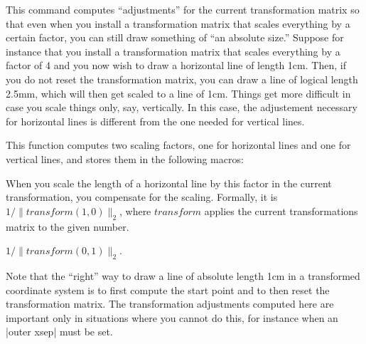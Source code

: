 \begin{command}{\pgftransformationadjustments}
  This command computes ``adjustments'' for the current transformation
  matrix so that even when you install a transformation matrix that
  scales everything by a certain factor, you can still draw
  something of ``an absolute size.'' Suppose for instance that you
  install a transformation matrix that scales everything by a factor
  of 4 and you now wish to draw a horizontal line of length 1cm. Then,
  if you do not reset the transformation matrix, you can draw a line
  of logical length 2.5mm, which will then get scaled to a line of
  1cm. Things get more difficult in case you scale things only, say,
  vertically. In this case, the adjustement necessary for horizontal
  lines is different from the one needed for vertical lines.

  This function computes two scaling factors, one for horizontal lines
  and one for vertical lines, and stores them in the following macros:
  \begin{command}{\pgfhorizontaltransformationadjustment}
    When you scale the length of a horizontal line by this factor in
    the current transformation, you compensate for the
    scaling. Formally, it is $1/\|\mathit{transform}(1,0)\|_2$, where
    $\mathit{transform}$ applies the current transformations matrix to
    the given number.
\begin{codeexample}[]
\end{codeexample}
\begin{codeexample}[]
\end{codeexample}
  \end{command}
  \begin{command}{\pgfverticaltransformationadjustment}
    $1/\|\mathit{transform}(0,1)\|_2$.
  \end{command}

  Note that the ``right'' way to draw a line of absolute length 1cm in
  a transformed coordinate system is to first compute the start point
  and to then reset the transformation matrix. The transformation
  adjustments computed here are important only in situations where you
  cannot do this, for instance when an |outer xsep| must be set.
\end{command}


